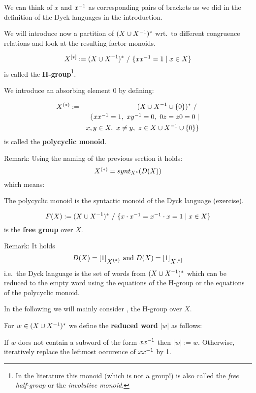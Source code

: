 We can think of $x$ and $\mbox{${x}^{-1}$}$ as corresponding pairs of brackets as we did
in the definition of the Dyck languages in the introduction.

We will introduce now a partition of $(X \cup {X}^{-1})^*$ wrt.\ to different
congruence relations and look at the resulting factor monoids.

\begin{definition}
\[ \hgroup{X} := (\unioninv{X})^*\ /\ \setof{x \inv{x} = 1 \mid x \in X} \]
is called the {\bf H-group}\footnote{In the literature this monoid (which is not a
group!) is also called the {\em free half-group} or the {\em involutive
monoid}.}.
\end{definition}

We introduce an absorbing element $0$ by defining:
\begin{definition}
\begin{eqnarray*}
\mbox{${X}^{(*)}$} & := & (X \cup {X}^{-1} \cup \mbox{$\{0\}$})^*\ /\ \\
& & \{ x \mbox{${x}^{-1}$} = 1,\ x \mbox{${y}^{-1}$} = 0,\ 0 z = z 0 = 0 \mid \\
& & x, y \in X,\ x \neq y,\ z \in X \cup {X}^{-1} \cup \mbox{$\{0\}$} \}
\end{eqnarray*}
is called the {\bf polycyclic monoid}.
\end{definition}

Remark: Using the naming of the previous section it holds:
\[ \mbox{${X}^{(*)}$} = synt_{X^*}(D(X)) \]
which means:

The polycyclic monoid is the syntactic monoid of the Dyck language (exercise).

\begin{definition}
\[ F(X) := (X \cup {X}^{-1})^*\ /\ \mbox{$\{x \cdot \mbox{${x}^{-1}$} = \mbox{${x}^{-1}$} \cdot x = 1
\mid x \in X\}$} \]
is the {\bf free group} over $X$.
\end{definition}

\label{dyck-language}
Remark: It holds 
\[ D(X) = [1]_{\mbox{${X}^{(*)}$}}\text{ and }D(X) = [1]_{\mbox{${X}^{[*]}$}} \]
i.e.\ the Dyck language is the set of words from $(X \cup {X}^{-1})^*$
which can be reduced to the empty word using the equations of the H-group or the
equations of the polycyclic monoid.

In the following we will mainly consider , the H-group over $X$.

For $w \in (X \cup {X}^{-1})^*$ we define the {\bf reduced word} $|w|$ as follows: 

If $w$ does not contain a subword of the form $x \mbox{${x}^{-1}$}$ then $|w| := w$.
Otherwise, iteratively replace the leftmost occurence of $x \mbox{${x}^{-1}$}$ by 1.

